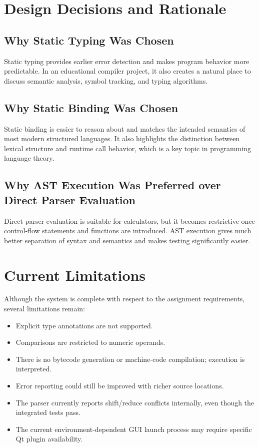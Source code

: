 \documentclass[12pt,a4paper]{article}
\begin{document}
\section{Design Decisions and Rationale}
\subsection{Why Static Typing Was Chosen}
Static typing provides earlier error detection and makes program behavior more predictable. In an educational compiler project, it also creates a natural place to discuss semantic analysis, symbol tracking, and typing algorithms.

\subsection{Why Static Binding Was Chosen}
Static binding is easier to reason about and matches the intended semantics of most modern structured languages. It also highlights the distinction between lexical structure and runtime call behavior, which is a key topic in programming language theory.

\subsection{Why AST Execution Was Preferred over Direct Parser Evaluation}
Direct parser evaluation is suitable for calculators, but it becomes restrictive once control-flow statements and functions are introduced. AST execution gives much better separation of syntax and semantics and makes testing significantly easier.

\section{Current Limitations}
Although the system is complete with respect to the assignment requirements, several limitations remain:

\begin{itemize}[leftmargin=1.0cm]
    \item Explicit type annotations are not supported.
    \item Comparisons are restricted to numeric operands.
    \item There is no bytecode generation or machine-code compilation; execution is interpreted.
    \item Error reporting could still be improved with richer source locations.
    \item The parser currently reports shift/reduce conflicts internally, even though the integrated tests pass.
    \item The current environment-dependent GUI launch process may require specific Qt plugin availability.
\end{itemize}
\end{document}
